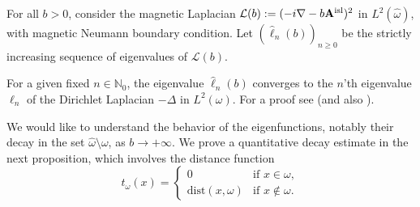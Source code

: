 \documentclass[11pt]{amsart}
\theoremstyle{remark}
\newcommand{\bA}{\mathbf{A}}
\numberwithin{equation}{section}
\begin{document}
For all $b>0$, consider the magnetic Laplacian $\mathcal L(b):=(-i\nabla-b\bA^{\rm isl})^2$ in $L^2(\hat\omega)$, with magnetic Neumann boundary condition. Let $(\hat\ell_n(b))_{n\geq 0}$ be the strictly increasing sequence of eigenvalues of $\mathcal L(b)$.

For a given fixed $n\in\mathbb N_0$, the eigenvalue $\hat\ell_n(b)$ converges to the $n$'th eigenvalue $\ell_n$ of the Dirichlet Laplacian $-\Delta$ in $L^2(\omega)$. For a proof see \cite{GKS} (and also \cite{KS}).

We would like to understand the behavior of the eigenfunctions, notably their decay in the set $\hat\omega\setminus\omega$, as $b\to+\infty$. We prove a quantitative  decay estimate in the next proposition, which involves the distance function
\[t_\omega(x)=\begin{cases}
0&\mbox{if }x\in \omega,\\
\mathrm{dist}(x,\omega)&\mbox{if }x\not\in\omega.    
\end{cases}\]
\end{document}
